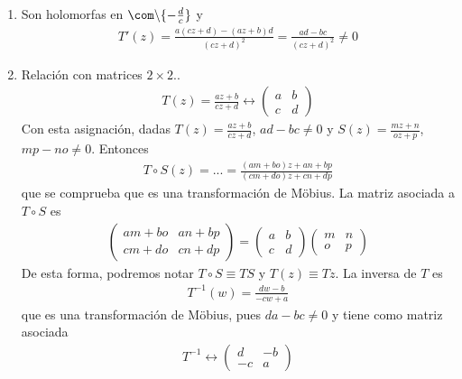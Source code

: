 \begin{enumerate}
    \item Son holomorfas en $\com \backslash \{ - \frac{d}{c}\}$ y
    \begin{align*}
        T'(z) = \frac{a(cz + d) - (az + b)d}{(cz+d)^2} = \frac{ad - bc}{(cz + d)^2}  \not = 0
    \end{align*}
    \item Relación con matrices $2 \times 2$..
    \begin{align*}
        T(z) = \frac{az + b}{cz + d} \longleftrightarrow \begin{pmatrix}
            a & b \\
            c & d
        \end{pmatrix}
    \end{align*}
    Con esta asignación, dadas $T(z) = \frac{az + b}{cz + d}$, $ad - bc \not = 0$ y $S(z) = \frac{mz + n}{oz + p}$, $mp - no \not = 0$. Entonces
    \begin{align*}
        T \circ S (z) = ... = \frac{(am + bo)z + an + bp}{(cm + do)z + cn + dp}
    \end{align*}
    que se comprueba que es una transformación de M\"obius. La matriz asociada a $T \circ S$ es
    \begin{align*}
        \begin{pmatrix}
            am + bo & an + bp \\
        cm + do & cn + dp
        \end{pmatrix} = \begin{pmatrix}
            a & b \\
            c & d
        \end{pmatrix} \begin{pmatrix}
            m & n \\
            o & p
        \end{pmatrix}
    \end{align*}
    De esta forma, podremos notar $T \circ S \equiv TS$ y $T(z) \equiv Tz$. La inversa de $T$ es
    \begin{align*}
        T^{-1}(w) = \frac{dw - b}{-cw + a}
    \end{align*}
    que es una transformación de M\"obius, pues $da - bc \not = 0$ y tiene como matriz asociada
    \begin{align*}
       T^{-1} \longleftrightarrow \begin{pmatrix}
            d & -b \\
            -c & a
        \end{pmatrix}

\end{align*}
\end{enumerate}
